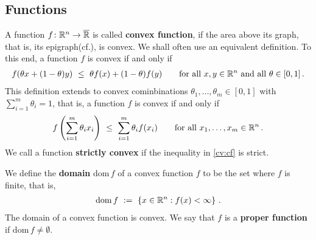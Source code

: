 \subsection*{Functions}
A function 
$
f
\colon
\mathbb{R}^n
\to
\overline{\mathbb{R}}
$
is called \textbf{convex function},
if the area above its graph, that is, its epigraph(cf.\cite[§2.4.1]{Mordukhovich2022}), is convex. We shall often use an equivalent definition.
To this end, 
a function $f$ is convex if and only if 
\begin{gather}
  \label{cv:cf}
  f(\theta x + (1-\theta)y)
  \ 
  \le
  \ 
  \theta f(x)
  +
  (1-\theta)f(y)
  \qquad
  \text{for all}\ 
  x,y\in \R^n
  \ 
  \text{and all}\ 
  \theta\in[0,1]
  \,.
\end{gather}
This definition extends to convex cominbinations
$
  \theta_1,\ldots,\theta_m\in[0,1]
$
with
$
  \sum_{i=1}^{m} 
  \theta_i
  =1
$, that is, 
a function $f$ is convex if and only if 
\begin{gather}
  f
  \left( 
    \sum_{i=1}^{m} 
    \theta_i
    x_i
  \right)
  \ 
  \le
  \ 
    \sum_{i=1}^{m} 
    \theta_i
    f(x_i)
  \qquad
  \text{for all}\ 
  x_1,\ldots,x_m\in \R^n
  \,.
\end{gather}
We call a function \textbf{strictly convex} if the inequality in
\eqref{cv:cf} is strict.

We define the \textbf{domain} $\mathrm{dom}\,f$
of a convex function $f$ to be the set where $f$ is finite, that is,
\begin{gather}
  \mathrm{dom}\,f
  \ 
  :=
  \ 
  \left\{ 
x\in\R^n
:
f(x)<\infty
  \right\}
  \,.
\end{gather}
The domain of a convex function is convex. 
We say that $f$ is a \textbf{proper function} if  $\mathrm{dom}\,f\neq\emptyset$. 

